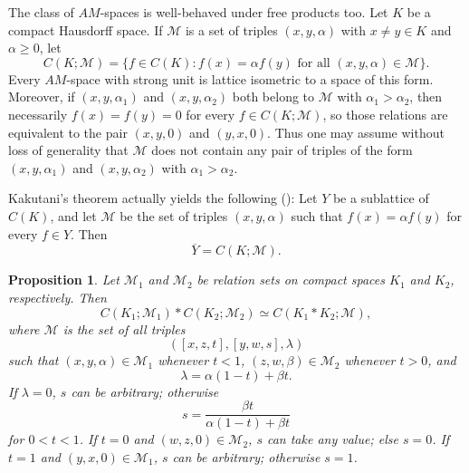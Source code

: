 \documentclass[12pt]{amsart}
\theoremstyle{plain}
\newtheorem{proposition}[theorem]{Proposition}
\theoremstyle{definition}
\begin{document}
The class of $AM$-spaces is well-behaved under free products too. Let $K$ be a compact Hausdorff space. If $\mathcal{M}$ is a set of triples $(x,y,\alpha)$ with $x\neq y\in K$ and $\alpha\geq 0$, let
\[
C(K;\mathcal{M})=\{f\in C(K): f(x)=\alpha f(y)\text{ for all }(x,y,\alpha)\in \mathcal{M}\}.
\]
Every $AM$-space with strong unit is lattice isometric to a space of this form. Moreover, if $(x,y,\alpha_1)$ and $(x,y,\alpha_2)$ both belong to $\mathcal{M}$ with $\alpha_1>\alpha_2$, then necessarily $f(x)=f(y)=0$ for every $f\in C(K;\mathcal{M})$, so those relations are equivalent to the pair $(x,y,0)$ and $(y,x,0)$. Thus one may assume without loss of generality that $\mathcal{M}$ does not contain any pair of triples of the form $(x,y,\alpha_1)$ and $(x,y,\alpha_2)$ with $\alpha_1>\alpha_2$.

Kakutani's theorem actually yields the following (\cite[Theorem 1.b.5]{LT2}):
Let $Y$ be a sublattice of $C(K)$, and let $\mathcal{M}$ be the set of triples $(x,y,\alpha)$ such that $f(x)=\alpha f(y)$ for every $f\in Y$. Then
\[
\overline{Y}=C(K;\mathcal{M}).
\]


\begin{proposition}\label{prop:AM-freeproduct}
Let $\mathcal{M}_1$ and $\mathcal{M}_2$ be relation sets on compact spaces $K_1$ and $K_2$, respectively. Then
\[
C(K_1;\mathcal{M}_1)\ast C(K_2;\mathcal{M}_2)\simeq C(K_1\ast K_2;\mathcal{M}),
\]
where $\mathcal M$ is the set of all triples
\[
([x,z,t],[y,w,s],\lambda)
\]
such that $(x,y,\alpha)\in \mathcal{M}_1$ whenever $t<1$, $(z,w,\beta)\in \mathcal{M}_2$ whenever $t>0$, and
\[
\lambda=\alpha(1-t)+\beta t.
\]
If $\lambda=0$, $s$ can be arbitrary; otherwise
\[
s=\frac{\beta t}{\alpha(1-t)+\beta t}
\]
for $0<t<1$. If $t=0$ and $(w,z,0)\in\mathcal{M}_2$, $s$ can take any value; else $s=0$. If $t=1$ and $(y,x,0)\in\mathcal{M}_1$, $s$ can be arbitrary; otherwise $s=1$.

\end{proposition}
\end{document}
